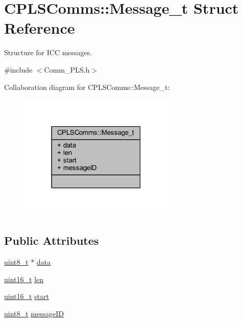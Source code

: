 \hypertarget{struct_c_p_l_s_comms_1_1_message__t}{}\section{C\+P\+L\+S\+Comms\+:\+:Message\+\_\+t Struct Reference}
\label{struct_c_p_l_s_comms_1_1_message__t}


Structure for I\+CC messages.  




{\ttfamily \#include $<$Comm\+\_\+\+P\+L\+S.\+h$>$}



Collaboration diagram for C\+P\+L\+S\+Comms\+:\+:Message\+\_\+t\+:
\nopagebreak
\begin{figure}[H]
\begin{center}
\leavevmode
\includegraphics[width=210pt]{struct_c_p_l_s_comms_1_1_message__t__coll__graph}
\end{center}
\end{figure}
\subsection*{Public Attributes}
\begin{DoxyCompactItemize}
\item 
\mbox{\hyperlink{_a_d_a_s___types_8h_aba7bc1797add20fe3efdf37ced1182c5}{uint8\+\_\+t}} $\ast$ \mbox{\hyperlink{struct_c_p_l_s_comms_1_1_message__t_a75d42db0cfdf64c0fe1ed1e8b0c472ed}{data}}
\item 
\mbox{\hyperlink{_a_d_a_s___types_8h_a1f1825b69244eb3ad2c7165ddc99c956}{uint16\+\_\+t}} \mbox{\hyperlink{struct_c_p_l_s_comms_1_1_message__t_a3af5b7fed96b157285ec6c8168b64276}{len}}
\item 
\mbox{\hyperlink{_a_d_a_s___types_8h_a1f1825b69244eb3ad2c7165ddc99c956}{uint16\+\_\+t}} \mbox{\hyperlink{struct_c_p_l_s_comms_1_1_message__t_a760e6f39adfed2b0440477560654f02f}{start}}
\item 
\mbox{\hyperlink{_a_d_a_s___types_8h_aba7bc1797add20fe3efdf37ced1182c5}{uint8\+\_\+t}} \mbox{\hyperlink{struct_c_p_l_s_comms_1_1_message__t_a451cdd914ba11c33528a4761ad38faee}{message\+ID}}
\end{DoxyCompactItemize}


